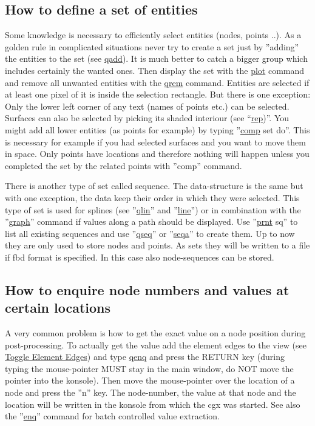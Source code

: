 \documentclass{article}
\providecommand{\htmlref}[2]{\hyperref[#2]{#1}}
\begin{document}
\begin{appendix}
\subsection{\label{How to define a set of entities}How to define a set of entities}
Some knowledge is necessary to efficiently select entities (nodes, points ..). As a golden rule in complicated situations never try to create a set just by ''adding'' the entities to the set (see \htmlref{qadd}{qadd}). It is much better to catch a bigger group which includes certainly the wanted ones. Then display the set with the \htmlref{plot}{plot} command and remove all unwanted entities with the \htmlref{qrem}{qrem} command. Entities are selected if at least one pixel of it is inside the selection rectangle. But there is one exception: Only the lower left corner of any text (names of points etc.) can be selected. Surfaces can also be selected by picking its shaded interiour (see ``\htmlref{rep}{rep})''. You might add all lower entities (as points for example) by typing ''\htmlref{comp}{comp} set do''. This is necessary for example if you had selected surfaces and you want to move them in space. Only points have locations and therefore nothing will happen unless you completed the set by the related points with ''comp'' command.

There is another type of set called sequence. The data-structure is the same but with one exception, the data keep their order in which they were selected. This type of set is used for splines (see ''\htmlref{qlin}{qlin}'' and ''\htmlref{line}{line}'') or in combination with the ''\htmlref{graph}{graph}'' command if values along a path should be displayed. Use ''\htmlref{prnt}{prnt} sq'' to list all existing sequences and use ''\htmlref{qseq}{qseq}'' or ''\htmlref{seqa}{seqa}'' to create them. Up to now they are only used to store nodes and points. As sets they will be written to a file if fbd format is specified. In this case also node-sequences can be stored.

\subsection{\label{How to enquire node numbers and values at certain locations}How to enquire node numbers and values at certain locations}
A very common problem is how to get the exact value on a node position during post-processing. To actually get the value add the element edges to the view (see \htmlref{Toggle Element Edges}{Toggle Element Edges}) and type \htmlref{qenq}{qenq} and press the RETURN key (during typing the mouse-pointer MUST stay in the main window, do NOT move the pointer into the konsole). Then move the mouse-pointer over the location of a node and press the ''n'' key. The node-number, the value at that node and the location will be written in the konsole from which the cgx was started. See also the ''\htmlref{enq}{enq}'' command for batch controlled value extraction.


\end{appendix}
\end{document}
